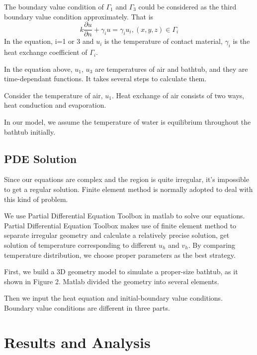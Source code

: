 \documentclass[12pt,a4paper,titlepage]{article}
\begin{document}
The boundary value condition of ${\Gamma}_1$ and ${\Gamma}_3$ could be considered as the third boundary value condition approximately. That is
\begin{equation}
 k\frac{\partial u}{\partial n}+{{\gamma}_i}u={{\gamma}_i}{u_i}, (x,y,z)\in {\Gamma}_i
\end{equation}
In the equation, i=1 or 3 and $u_i$ is the temperature of contact material,
${\gamma}_i$ is the heat exchange coefficient of ${\Gamma}_i$.

In the equation above, $u_1$, $u_3$ are temperatures of air and bathtub, and they are time-dependant functions. It takes several steps to calculate them.

Consider the temperature of air, $u_1$. Heat exchange of air consists of two ways, heat conduction and evaporation.

In our model, we assume the temperature of water is equilibrium throughout the bathtub initially.

\subsection{PDE Solution}
\label{sec:PDE solution}
Since our equations are complex and the region is quite irregular, it's impossible to get a regular solution. Finite element method is normally adopted to deal with this kind of problem.

We use Partial Differential Equation Toolbox in matlab to solve our equations. Partial Differential Equation Toolbox makes use of finite element method to separate irregular geometry and calculate a relatively precise solution, get solution of temperature corresponding to different $u_h$ and $v_h$. By comparing temperature distribution, we choose proper parameters as the best strategy.

First, we build a 3D geometry model to simulate a proper-size bathtub, as it shown in Figure 2. Matlab divided the geometry into several elements.

Then we input the heat equation and initial-boundary value conditions. Boundary value conditions are different in three parts.

\section{Results and Analysis}
\label{sec:performance-and-analysis}
\end{document}
